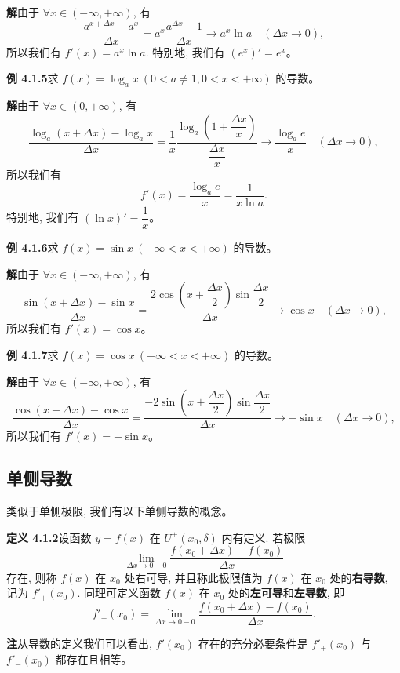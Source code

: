 \documentclass[UTF8, 12pt, fontset=fandol, oneside]{ctexart}
\begin{document}
\noindent\textbf{解}\quad 由于 $\forall x\in(-\infty,+\infty)$, 有
\[
  \frac{a^{x+\Delta x}-a^x}{\Delta x}
  =
  a^x\frac{a^{\Delta x}-1}{\Delta x}
  \to a^x\ln a\quad(\Delta x\to0),
\]
所以我们有 $f'(x)=a^x\ln a$. 特别地, 我们有 $(e^x)'=e^x$。

\noindent\textbf{例 4.1.5}\quad 求 $f(x)=\log_a x\ (0<a\ne1,0<x<+\infty)$ 的导数。

\noindent\textbf{解}\quad 由于 $\forall x\in(0,+\infty)$, 有
\[
  \frac{\log_a(x+\Delta x)-\log_a x}{\Delta x}
  =
  \frac1x
  \frac{\log_a\left(1+\dfrac{\Delta x}{x}\right)}
       {\dfrac{\Delta x}{x}}
  \to
  \frac{\log_a e}{x}\quad(\Delta x\to0),
\]
所以我们有
\[
  f'(x)=\frac{\log_a e}{x}=\frac1{x\ln a}.
\]
特别地, 我们有 $(\ln x)'=\dfrac1x$。

\noindent\textbf{例 4.1.6}\quad 求 $f(x)=\sin x\ (-\infty<x<+\infty)$ 的导数。

\noindent\textbf{解}\quad 由于 $\forall x\in(-\infty,+\infty)$, 有
\[
  \frac{\sin(x+\Delta x)-\sin x}{\Delta x}
  =
  \frac{2\cos\left(x+\dfrac{\Delta x}{2}\right)\sin\dfrac{\Delta x}{2}}
       {\Delta x}
  \to
  \cos x\quad(\Delta x\to0),
\]
所以我们有 $f'(x)=\cos x$。

\noindent\textbf{例 4.1.7}\quad 求 $f(x)=\cos x\ (-\infty<x<+\infty)$ 的导数。

\noindent\textbf{解}\quad 由于 $\forall x\in(-\infty,+\infty)$, 有
\[
  \frac{\cos(x+\Delta x)-\cos x}{\Delta x}
  =
  \frac{-2\sin\left(x+\dfrac{\Delta x}{2}\right)\sin\dfrac{\Delta x}{2}}
       {\Delta x}
  \to
  -\sin x\quad(\Delta x\to0),
\]
所以我们有 $f'(x)=-\sin x$。

\subsection{单侧导数}

类似于单侧极限, 我们有以下单侧导数的概念。

\noindent\textbf{定义 4.1.2}\quad 设函数 $y=f(x)$ 在 $U^+(x_0,\delta)$ 内有定义. 若极限
\[
  \lim_{\Delta x\to0+0}
  \frac{f(x_0+\Delta x)-f(x_0)}{\Delta x}
\]
存在, 则称 $f(x)$ 在 $x_0$ 处右可导, 并且称此极限值为 $f(x)$ 在 $x_0$ 处的\textbf{右导数}, 记为 $f'_+(x_0)$. 同理可定义函数 $f(x)$ 在 $x_0$ 处的\textbf{左可导}和\textbf{左导数}, 即
\[
  f'_-(x_0)=
  \lim_{\Delta x\to0-0}
  \frac{f(x_0+\Delta x)-f(x_0)}{\Delta x}.
\]

\noindent\textbf{注}\quad 从导数的定义我们可以看出, $f'(x_0)$ 存在的充分必要条件是 $f'_+(x_0)$ 与 $f'_-(x_0)$ 都存在且相等。
\end{document}

